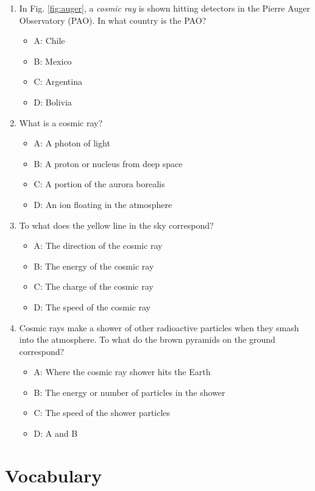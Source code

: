 \documentclass[10pt]{article}
\begin{document}
\begin{enumerate}
\item In Fig. \ref{fig:auger}, a \textit{cosmic ray} is shown hitting detectors in the Pierre Auger Observatory (PAO).  In what country is the PAO?
\begin{itemize}
\item A: Chile
\item B: Mexico
\item C: Argentina
\item D: Bolivia
\end{itemize}
\clearpage
\item What is a cosmic ray?
\begin{itemize}
\item A: A photon of light
\item B: A proton or nucleus from deep space
\item C: A portion of the aurora borealis
\item D: An ion floating in the atmosphere
\end{itemize}
\item To what does the yellow line in the sky correspond?
\begin{itemize}
\item A: The direction of the cosmic ray
\item B: The energy of the cosmic ray
\item C: The charge of the cosmic ray
\item D: The speed of the cosmic ray
\end{itemize}
\item Cosmic rays make a shower of other radioactive particles when they smash into the atmosphere.  To what do the brown pyramids on the ground correspond?
\begin{itemize}
\item A: Where the cosmic ray shower hits the Earth
\item B: The energy or number of particles in the shower
\item C: The speed of the shower particles
\item D: A and B
\end{itemize}
\end{enumerate}

\section{Vocabulary}
\end{document}
